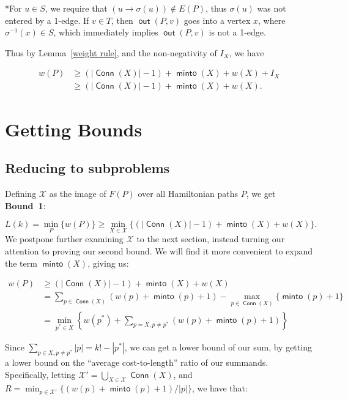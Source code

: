 \documentclass{article}
\DeclareMathOperator{\minto}{\bm{\mathsf{minto}}}
\DeclareMathOperator{\out}{\bm{\mathsf{out}}}
\DeclareMathOperator{\Conn}{\bm{\mathsf{Conn}}}
\newcommand{\edit}[1]{}%
\newcommand{\dc}[1]{}%
\begin{document}
*For $u \in S$, we require that $(u \to \sigma(u)) \not \in E(P)$, thus $\sigma(u)$ was not entered by a 1-edge. If $v \in T$, then $\out(P,v)$ goes into a vertex $x$, where $\sigma^{-1}(x) \in S$, which immediately implies $\out(P,v)$ is not a 1-edge.

\vspace{1.75em}

Thus by Lemma~\ref{weight rule}, and the non-negativity of $I_X$, we have

\begin{align*} w(P) &\geq (|\Conn(X)|-1)+\minto(X)+w(X)+I_X\\
&\geq (|\Conn(X)|-1)+\minto(X)+w(X).\end{align*}

\section{Getting Bounds} \label{reductions}

\subsection{Reducing to subproblems} \label{to subproblems}

Defining $\mathcal{X}$ as the image of $F(P)$ over all Hamiltonian paths $P$, we get \textbf{Bound~1}\dc{ label/ref}:

\[L(k) = \min_{P} \{w(P)\} \geq \min_{X \in \mathcal{X}} \{(|\Conn(X)|-1) + \minto(X) + w(X)\}.\]
We postpone further examining $\mathcal{X}$ to the next section, instead turning our attention to proving our second bound. We will find it more convenient to expand the term $\minto(X)$, giving us:

\begin{align*}
    w(P) &\geq (|\Conn(X)|-1) + \minto(X) + w(X) \\
    &= \sum_{p \in \Conn(X)} (w(p)+\minto(p)+1) - \max_{p \in \Conn(X)}\{\minto(p)+1\} \\
    &= \min_{p^* \in X}\left\{w(p^*) + \sum_{p = X, p \neq p^*} (w(p)+\minto(p)+1)\right\}
\end{align*}

Since $\displaystyle \sum_{p \in X, p \neq p^*} |p| = k!-|p^*|$, we can get a lower bound of our sum, by getting a lower bound on the  ``average cost-to-length'' ratio of our summands. Specifically, letting $\displaystyle \mathcal{X}' = \bigcup_{X \in \mathcal{X}} \Conn(X)$, and $\displaystyle  R = \min_{p \in \mathcal{X}'}\{(w(p)+\minto(p)+1)/|p|\}$, we have that:\edit{ should probably specify that $p^*$ is fixed after being chosen in the top equation}\dc{ define $p^*$ outside, like ``let $p^*$ be the path which minimizes ...''}
\end{document}

